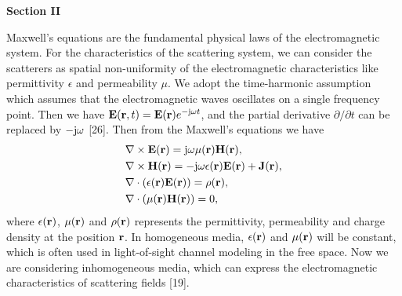 \documentclass[a4paper,12pt]{article}
\begin{document}
{}
\begin{framed}
	{\bf Section II}

	\setcounter{equation}{0}

    \quad Maxwell's equations are the fundamental physical laws of the electromagnetic system. For the characteristics of the scattering system, we can consider the scatterers as spatial non-uniformity of the electromagnetic characteristics like permittivity $\epsilon$ and permeability $\mu$. {\color{red}We adopt the time-harmonic assumption which assumes that the electromagnetic waves oscillates on a single frequency point. Then we have ${\bf E}({\bf r},t) = {\bf E}({\bf r})e^{-{\rm j}\omega t}$, and the partial derivative $\partial/\partial t$ can be replaced by $-{\rm j}\omega$ [26].
Then from the Maxwell's equations we have}
\begin{subequations}
	\begin{align} 
		&\nabla \times {\bf E}({\bf r}) = {\rm j}\omega \mu({\bf r}) {\bf H}({\bf r}), \label{maxwell_1}\\
		& \nabla \times {\bf H}({\bf r}) = -{\rm j}\omega \epsilon({\bf r}) {\bf E}({\bf r})+{\bf J}({\bf r}),  \label{maxwell_2}\\
		& \nabla \cdot  (\epsilon({\bf r}) {\bf E}({\bf r})) = \rho({\bf r}),\\
		& \nabla \cdot (\mu({\bf r}) {\bf H}({\bf r})) = 0,
	\end{align}
\end{subequations}
where $\epsilon({\bf r})$, ${\mu}({\bf r})$ and $\rho({\bf r})$ represents the permittivity, permeability and charge density at the position ${\bf r}$. In homogeneous media, $\epsilon({\bf r})$ and ${\mu}({\bf r})$ will be constant, which is often used in light-of-sight channel modeling in the free space. Now we are considering inhomogeneous media, which can express the electromagnetic characteristics of scattering fields [19]. 


\end{framed}
\end{document}
